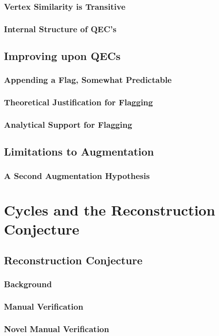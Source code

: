 \documentclass[11pt,a4paper]{report}
\begin{document}
\subsection{Vertex Similarity is Transitive}
\subsection{Internal Structure of QEC's}

\section{Improving upon QECs}
\subsection{Appending a Flag, Somewhat Predictable}
\subsection{Theoretical Justification for Flagging}
\subsection{Analytical Support for Flagging}

\section{Limitations to Augmentation}
\subsection{A Second Augmentation Hypothesis}


\chapter{Cycles and the Reconstruction Conjecture}

\section{Reconstruction Conjecture}
\subsection{Background}
\subsection{Manual Verification}
\subsection{Novel Manual Verification}
\end{document}
